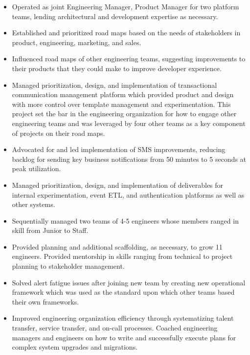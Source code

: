 \documentclass[10pt,letterpaper]{altacv}
\begin{document}
\begin{itemize}
\item Operated as joint Engineering Manager, Product Manager for two platform
  teams, lending architectural and development expertise as necessary.
\item Established and prioritized road maps based on the needs of stakeholders
  in product, engineering, marketing, and sales.
\item Influenced road maps of other engineering teams, suggesting improvements
  to their products that they could make to improve developer experience.
\item Managed prioritization, design, and implementation of transactional
  communication management platform which provided product and design with more
  control over template management and experimentation. This project set the bar
  in the engineering organization for how to engage other engineering teams and
  was leveraged by four other teams as a key component of projects on their road
  maps.
\item Advocated for and led implementation of SMS improvements, reducing
  backlog for sending key business notifications from 50 minutes to 5
  seconds at peak utilization.
\item Managed prioritization, design, and implementation of deliverables for
  internal experimentation, event ETL, and authentication platforms as well as
  other systems.
\item Sequentially managed two teams of 4-5 engineers whose members ranged in
  skill from Junior to Staff.
\item Provided planning and additional scaffolding, as necessary, to grow 11
  engineers. Provided mentorship in skills ranging from technical to project
  planning to stakeholder management.
\item Solved alert fatigue issues after joining new team by creating new
  operational framework which was used as the standard upon which other teams
  based their own frameworks.
\item Improved engineering organization efficiency through systematizing talent
  transfer, service transfer, and on-call processes. Coached engineering
  managers and engineers on how to write and successfully execute plans for
  complex system upgrades and migrations.
\end{itemize}

\divider
\end{document}
